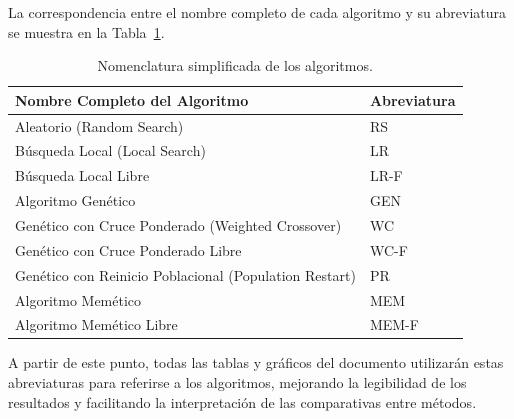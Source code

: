 La correspondencia entre el nombre completo de cada algoritmo y su abreviatura se muestra en la Tabla~\ref{tab:nombres-algoritmos}.

\begin{table}[htp]
    \centering
    \begin{tabular}{ll}
        \toprule
        \textbf{Nombre Completo del Algoritmo}                 & \textbf{Abreviatura} \\
        \midrule
        Aleatorio (Random Search)                              & RS                   \\
        Búsqueda Local (Local Search)                          & LR                   \\
        Búsqueda Local Libre                                   & LR-F                 \\
        Algoritmo Genético                                     & GEN                  \\
        Genético con Cruce Ponderado (Weighted Crossover)      & WC                   \\
        Genético con Cruce Ponderado Libre                     & WC-F                 \\
        Genético con Reinicio Poblacional (Population Restart) & PR                   \\
        Algoritmo Memético                                     & MEM                  \\
        Algoritmo Memético Libre                               & MEM-F                \\
        \bottomrule
    \end{tabular}
    \caption{Nomenclatura simplificada de los algoritmos.}
    \label{tab:nombres-algoritmos}
\end{table}

A partir de este punto, todas las tablas y gráficos del documento utilizarán estas abreviaturas para referirse a los algoritmos,
mejorando la legibilidad de los resultados y facilitando la interpretación de las comparativas entre métodos.
